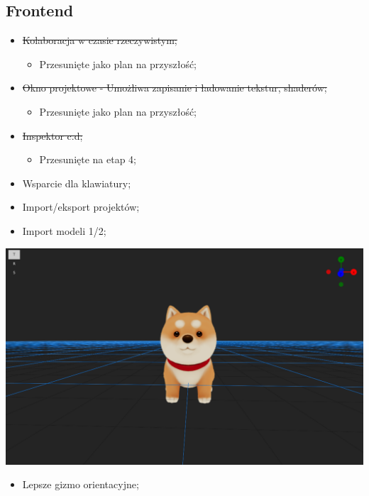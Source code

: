 \documentclass[11pt]{article}
\begin{document}
\subsection{Frontend}
\label{sec:org94cdbe6}
\begin{itemize}
\item \sout{Kolaboracja w czasie rzeczywistym;}
\begin{itemize}
\item Przesunięte jako plan na przyszłość;
\end{itemize}
\item \sout{Okno projektowe - Umożliwa zapisanie i ładowanie tekstur, shaderów;}
\begin{itemize}
\item Przesunięte jako plan na przyszłość;
\end{itemize}
\item \sout{Inspektor c.d;}
\begin{itemize}
\item Przesunięte na etap 4;
\end{itemize}
\item Wsparcie dla klawiatury;
\item Import/eksport projektów;
\item Import modeli 1/2;
\end{itemize}
\begin{center}
\includegraphics[width=.9\linewidth]{./img/model.jpg}
\end{center}
\begin{itemize}
\item Lepsze gizmo orientacyjne;
\end{itemize}
\end{document}
